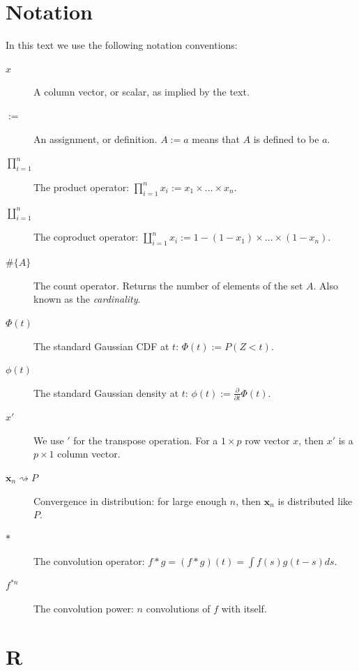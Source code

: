 \documentclass[12pt,a4paper]{report}
\theoremstyle{plain}
\theoremstyle{definition}
\newcommand{\set}[1]{\{ #1 \}} \newcommand{\setII}[1]{\left\{ #1 \right\}} \newcommand{\rv}[1]{\mathbf{#1}} \newcommand{\x}{\rv x} \newcommand{\y}{\rv y} \newcommand{\U}{\rv u} \newcommand{\T}{\rv t} \newcommand{\X}{\rv X} \newcommand{\Y}{\rv Y} \newcommand{\expect}[1]{\mathbf{E}\left[ #1 \right]} \newcommand{\expectg}[2]{\mathbf{E}_{\rv{#1}}\left[ \rv{#2} \right]} \newcommand{\expectn}[1]{\mathbb{E}\left[#1\right]} \newcommand{\cov}[1]{\mathbf{Cov} \left[ #1 \right]} \newcommand{\var}[1]{\mathop{Var} \left[ #1 \right]} \newcommand{\covn}[1]{\mathbb{Cov} \left[ #1 \right]} \newcommand{\gauss}[1]{\mathcal{N}\left(#1\right)} \newcommand{\cdf}[2]{F_{#1} (#2)} \newcommand{\survive}[2]{S_{#1} (#2)} \newcommand{\hazard}[2]{h_{#1} (#2)} \newcommand{\cuhazard}[2]{H_{#1} (#2)} \newcommand{\cdfn}[2]{\mathbb{F}_{#1}(#2)} \newcommand{\icdf}[2]{F_\rv{#1}^{-1} (#2)} \newcommand{\icdfn}[2]{\mathbb{F}^{-1}_{#1}(#2)} \newcommand{\pdf}[2]{p_{#1} (#2)} \newcommand{\prob}[1]{P\left( #1 \right)} \newcommand{\dist}{P} \newcommand{\density}{p}
\newcommand{\conv}{\ast}
\begin{document}
\newpage

\appendix




\chapter{Notation}
\label{apx:notation}

In this text we use the following notation conventions:
\begin{description}
\item[$x$] A column vector, or scalar, as implied by the text. 
\item[$:=$] An assignment, or definition. $A:=a$ means that $A$ is defined to be $a$. 
\item[$\prod_{i=1}^{n}$] The product operator: $\prod_{i=1}^{n} x_i:= x_1 \times \dots \times x_n$.
\item[$\coprod_{i=1}^{n}$] The coproduct operator: $\coprod_{i=1}^{n} x_i:= 1-(1-x_1) \times \dots \times (1-x_n)$.
\item[$\#\set{A}$] The count operator. Returns the number of elements of the set $A$. Also known as the \emph{cardinality}.
\item[$\Phi(t)$] The standard Gaussian CDF at $t$: $\Phi(t):= P(Z<t)$.
\item[$\phi(t)$] The standard Gaussian density at $t$: $\phi(t):= \frac{\partial}{\partial t}\Phi(t)$.
\item[$x'$] We use $'$ for the transpose operation. For a $1\times p$ row vector $x$, then $x'$ is a $p \times 1$ column vector.
\item[$\x_n \rightsquigarrow \dist$] Convergence in distribution: for large enough $n$, then $\x_n$ is distributed like $\dist$.
\item[$\conv$] The convolution operator: $f \conv g=(f \conv g)(t)=\int f(s) g(t-s) ds$.
\item[$f^{\conv n}$] The convolution power: $n$ convolutions of $f$ with itself.
\end{description}


 



\chapter{R}
\label{apx:r}
\end{document}
